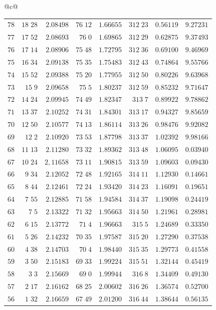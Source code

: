 \begin{center}
{\begin{tabular}{@{}c@{}}
\begin{tabular}{r|r|r|r|r|r|r|r}
$78$&$18\;28$&$2.08498$&$76\;12$&$1.66655$&$312\;23$&$0.56119$&$9.27231$\\
$77$&$17\;52$&$2.08693$&$76\;0$&$1.69865$&$312\;29$&$0.62875$&$9.37493$\\
$76$&$17\;14$&$2.08906$&$75\;48$&$1.72795$&$312\;36$&$0.69100$&$9.46969$\\[2pt]
$75$&$16\;34$&$2.09138$&$75\;35$&$1.75483$&$312\;43$&$0.74864$&$9.55766$\\
$74$&$15\;52$&$2.09388$&$75\;20$&$1.77955$&$312\;50$&$0.80226$&$9.63968$\\
$73$&$15\;9$&$2.09658$&$75\;5$&$1.80237$&$312\;59$&$0.85232$&$9.71647$\\
$72$&$14\;24$&$2.09945$&$74\;49$&$1.82347$&$313\;7$&$0.89922$&$9.78862$\\
$71$&$13\;37$&$2.10252$&$74\;31$&$1.84301$&$313\;17$&$0.94327$&$9.85659$\\[2pt]
$70$&$12\;50$&$2.10577$&$74\;13$&$1.86114$&$313\;26$&$0.98476$&$9.92082$\\
$69$&$12\;2$&$2.10920$&$73\;53$&$1.87798$&$313\;37$&$1.02392$&$9.98166$\\
$68$&$11\;13$&$2.11280$&$73\;32$&$1.89362$&$313\;48$&$1.06095$&$0.03940$\\
$67$&$10\;24$&$2,11658$&$73\;11$&$1.90815$&$313\;59$&$1.09603$&$0.09430$\\
$66$&$9\;34$&$2.12052$&$72\;48$&$1.92165$&$314\;11$&$1.12930$&$0.14661$\\[2pt]
$65$&$8\;44$&$2.12461$&$72\;24$&$1.93420$&$314\;23$&$1.16091$&$0.19651$\\
$64$&$7\;55$&$2.12885$&$71\;58$&$1.94584$&$314\;37$&$1.19098$&$0.24419$\\
$63$&$7\;5$&$2.13322$&$71\;32$&$1.95663$&$314\;50$&$1.21961$&$0.28981$\\
$62$&$6\;15$&$2.13772$&$71\;4$&$1.96663$&$315\;5$&$1.24689$&$0.33350$\\
$61$&$5\;26$&$2.14232$&$70\;35$&$1.97587$&$315\;20$&$1.27290$&$0.37538$\\[2pt]
$60$&$4\;38$&$2.14703$&$70\;4$&$1.98440$&$315\;35$&$1.29773$&$0.41558$\\
$59$&$3\;50$&$2.15183$&$69\;33$&$1.99224$&$315\;51$&$1.32144$&$0.45419$\\
$58$&$3\;3$&$2.15669$&$69\;0$&$1.99944$&$316\;8$&$1.34409$&$0.49130$\\
$57$&$2\;17$&$2.16162$&$68\;25$&$2.00602$&$316\;26$&$1.36574$&$0.52700$\\
$56$&$1\;32$&$2.16659$&$67\;49$&$2.01200$&$316\;44$&$1.38644$&$0.56135$\\[2pt]

\end{tabular}
\end{tabular}}
\end{center}
